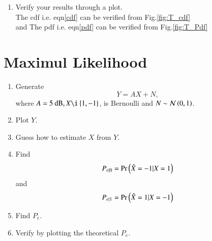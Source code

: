 \documentclass[journal,12pt,twocolumn]{IEEEtran}
\renewcommand\thesection{\arabic{section}}
\begin{document}
\begin{enumerate}[label=\thesection.\arabic*
,ref=\thesection.\theenumi]
\begin{itemize}
\end{itemize}
Now the theoretical expression of cdf of $T$
\begin{align}
    F_T(t) &= \int_{0}^{t}f_T(t)dx\\
    &=\begin{cases}
        \int_{0}^{t} dt &0<t<1 \\
        \int_{0}^{t} (2-t)dt &1<t<2 \\
        \int_{0}^{2} (2-t)dt &t>2
    \end{cases} \\ \label{cdf}
    &=\begin{cases}
        0 & t<0 \\
        \frac{t^2}{2} &0<t<1\\
        2t - \frac{t^2}{2} & 1<t<2\\
        1 & t>2
    \end{cases}
\end{align}
\item Verify your results through a plot. \\
\solution The cdf i.e. eqn\ref{cdf} can be verified from Fig.\ref{fig:T_cdf}\\
and The pdf i.e. eqn\ref{pdf} can be verified from Fig.\ref{fig:T_Pdf}

\end{enumerate}

\section{Maximul Likelihood}
\begin{enumerate}[label=\thesection.\arabic*
,ref=\thesection.\theenumi]
\item Generate 
\begin{equation}
Y = AX+N,
\end{equation}
		where $A = 5 \text{ dB}, X \i \cbrak{1,-1}$,  is Bernoulli and $N \sim \mathcal{N}\left(0,1\right)$.\\
\solution
\item Plot $Y$.\\
\solution
\item Guess how to estimate $X$ from $Y$.\\
\solution
\item
\label{ml-ch4_sim}
Find 
\begin{equation}
	P_{e|0} = \Pr\left(\hat{X} = -1|X=1\right)
\end{equation}
and 
\begin{equation}
	P_{e|1} = \Pr\left(\hat{X} = 1|X=-1\right)
\end{equation}
%
\solution
\item Find $P_e$.\\
%
\solution
\item
Verify by plotting  the theoretical $P_e$.\\  
\solution
		\end{enumerate}
\end{document}
